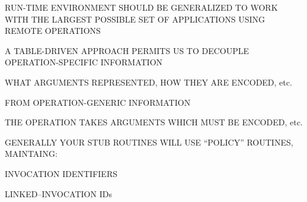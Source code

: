 \begin{bwslide}

\begin{nrtc}
\item	RUN-TIME ENVIRONMENT SHOULD BE GENERALIZED TO WORK WITH THE LARGEST
	POSSIBLE SET OF APPLICATIONS USING REMOTE OPERATIONS

\item	A TABLE-DRIVEN APPROACH PERMITS US TO DECOUPLE OPERATION-SPECIFIC
	INFORMATION
    \begin{nrtc}
    \item	WHAT ARGUMENTS REPRESENTED, HOW THEY ARE ENCODED, etc.
    \end{nrtc}
	FROM OPERATION-GENERIC INFORMATION
    \begin{nrtc}
    \item	THE OPERATION TAKES ARGUMENTS WHICH MUST BE ENCODED, etc.
    \end{nrtc}
\end{nrtc}
\end{bwslide}


\begin{bwslide}

\begin{nrtc}
%
\item	GENERALLY YOUR STUB ROUTINES WILL USE ``POLICY'' ROUTINES, MAINTAING:
	\begin{nrtc}
	\item	INVOCATION IDENTIFIERS
	\item	LINKED--INVOCATION IDs
	\end{nrtc}
\end{nrtc}
\end{bwslide}



